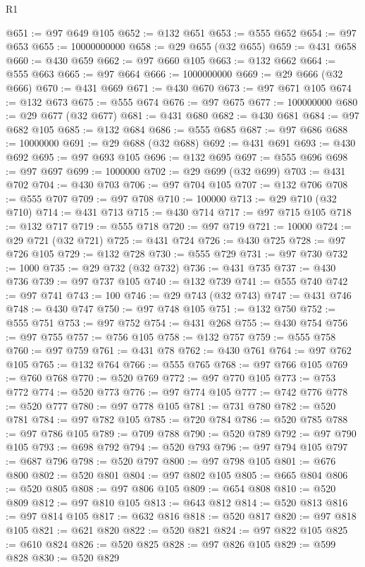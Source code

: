 \begin{lexlean}{R1}
\begin{coremodule}
@651 := @97 @649 @105
@652 := @132 @651
@653 := @555 @652
@654 := @97 @653
@655 := 10000000000
@658 := @29 @655 (@32 @655)
@659 := @431 @658
@660 := @430 @659
@662 := @97 @660 @105
@663 := @132 @662
@664 := @555 @663
@665 := @97 @664
@666 := 1000000000
@669 := @29 @666 (@32 @666)
@670 := @431 @669
@671 := @430 @670
@673 := @97 @671 @105
@674 := @132 @673
@675 := @555 @674
@676 := @97 @675
@677 := 100000000
@680 := @29 @677 (@32 @677)
@681 := @431 @680
@682 := @430 @681
@684 := @97 @682 @105
@685 := @132 @684
@686 := @555 @685
@687 := @97 @686
@688 := 10000000
@691 := @29 @688 (@32 @688)
@692 := @431 @691
@693 := @430 @692
@695 := @97 @693 @105
@696 := @132 @695
@697 := @555 @696
@698 := @97 @697
@699 := 1000000
@702 := @29 @699 (@32 @699)
@703 := @431 @702
@704 := @430 @703
@706 := @97 @704 @105
@707 := @132 @706
@708 := @555 @707
@709 := @97 @708
@710 := 100000
@713 := @29 @710 (@32 @710)
@714 := @431 @713
@715 := @430 @714
@717 := @97 @715 @105
@718 := @132 @717
@719 := @555 @718
@720 := @97 @719
@721 := 10000
@724 := @29 @721 (@32 @721)
@725 := @431 @724
@726 := @430 @725
@728 := @97 @726 @105
@729 := @132 @728
@730 := @555 @729
@731 := @97 @730
@732 := 1000
@735 := @29 @732 (@32 @732)
@736 := @431 @735
@737 := @430 @736
@739 := @97 @737 @105
@740 := @132 @739
@741 := @555 @740
@742 := @97 @741
@743 := 100
@746 := @29 @743 (@32 @743)
@747 := @431 @746
@748 := @430 @747
@750 := @97 @748 @105
@751 := @132 @750
@752 := @555 @751
@753 := @97 @752
@754 := @431 @268
@755 := @430 @754
@756 := @97 @755
@757 := @756 @105
@758 := @132 @757
@759 := @555 @758
@760 := @97 @759
@761 := @431 @78
@762 := @430 @761
@764 := @97 @762 @105
@765 := @132 @764
@766 := @555 @765
@768 := @97 @766 @105
@769 := @760 @768
@770 := @520 @769
@772 := @97 @770 @105
@773 := @753 @772
@774 := @520 @773
@776 := @97 @774 @105
@777 := @742 @776
@778 := @520 @777
@780 := @97 @778 @105
@781 := @731 @780
@782 := @520 @781
@784 := @97 @782 @105
@785 := @720 @784
@786 := @520 @785
@788 := @97 @786 @105
@789 := @709 @788
@790 := @520 @789
@792 := @97 @790 @105
@793 := @698 @792
@794 := @520 @793
@796 := @97 @794 @105
@797 := @687 @796
@798 := @520 @797
@800 := @97 @798 @105
@801 := @676 @800
@802 := @520 @801
@804 := @97 @802 @105
@805 := @665 @804
@806 := @520 @805
@808 := @97 @806 @105
@809 := @654 @808
@810 := @520 @809
@812 := @97 @810 @105
@813 := @643 @812
@814 := @520 @813
@816 := @97 @814 @105
@817 := @632 @816
@818 := @520 @817
@820 := @97 @818 @105
@821 := @621 @820
@822 := @520 @821
@824 := @97 @822 @105
@825 := @610 @824
@826 := @520 @825
@828 := @97 @826 @105
@829 := @599 @828
@830 := @520 @829

\end{coremodule}
\end{lexlean}
